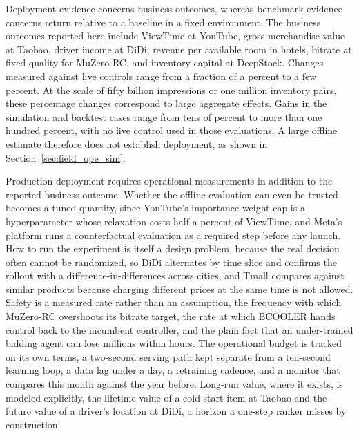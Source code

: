 Deployment evidence concerns business outcomes, whereas benchmark evidence concerns return relative to a baseline in a fixed environment. The business outcomes reported here include ViewTime at YouTube, gross merchandise value at Taobao, driver income at DiDi, revenue per available room in hotels, bitrate at fixed quality for MuZero-RC, and inventory capital at DeepStock. Changes measured against live controls range from a fraction of a percent to a few percent. At the scale of fifty billion impressions or one million inventory pairs, these percentage changes correspond to large aggregate effects. Gains in the simulation and backtest cases range from tens of percent to more than one hundred percent, with no live control used in those evaluations. A large offline estimate therefore does not establish deployment, as shown in Section~\ref{sec:field_ope_sim}.

Production deployment requires operational measurements in addition to the reported business outcome. Whether the offline evaluation can even be trusted becomes a tuned quantity, since YouTube's importance-weight cap is a hyperparameter whose relaxation costs half a percent of ViewTime, and Meta's platform runs a counterfactual evaluation as a required step before any launch. How to run the experiment is itself a design problem, because the real decision often cannot be randomized, so DiDi alternates by time slice and confirms the rollout with a difference-in-differences across cities, and Tmall compares against similar products because charging different prices at the same time is not allowed. Safety is a measured rate rather than an assumption, the frequency with which MuZero-RC overshoots its bitrate target, the rate at which BCOOLER hands control back to the incumbent controller, and the plain fact that an under-trained bidding agent can lose millions within hours. The operational budget is tracked on its own terms, a two-second serving path kept separate from a ten-second learning loop, a data lag under a day, a retraining cadence, and a monitor that compares this month against the year before. Long-run value, where it exists, is modeled explicitly, the lifetime value of a cold-start item at Taobao and the future value of a driver's location at DiDi, a horizon a one-step ranker misses by construction.
